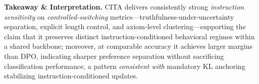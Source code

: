 \noindent\textbf{Takeaway \& Interpretation.} \textsc{CITA} delivers consistently strong \emph{instruction sensitivity} on \emph{controlled-switching} metrics—truthfulness-under-uncertainty separation, explicit length control, and axiom-level clustering—supporting the claim that it preserves distinct instruction-conditioned behavioral regimes within a shared backbone; moreover, at comparable accuracy it achieves larger margins than \textsc{DPO}, indicating sharper preference separation without sacrificing classification performance, a pattern \emph{consistent with} mandatory KL anchoring stabilizing instruction-conditioned updates.











